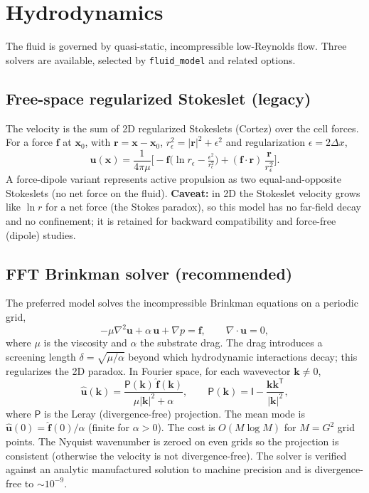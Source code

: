 \documentclass[11pt]{article}
\newcommand{\vu}{\bm{u}}
\newcommand{\vf}{\bm{f}}
\newcommand{\vx}{\bm{x}}
\newcommand{\vk}{\bm{k}}
\newcommand{\vr}{\bm{r}}
\newcommand{\grad}{\nabla}
\newcommand{\dx}{\Delta x}
\begin{document}
\section{Hydrodynamics}\label{sec:fluid}

The fluid is governed by quasi-static, incompressible low-Reynolds flow. Three
solvers are available, selected by \texttt{fluid\_model} and related options.

\subsection{Free-space regularized Stokeslet (legacy)}
The velocity is the sum of 2D regularized Stokeslets (Cortez) over the cell
forces. For a force $\vf$ at $\vx_0$, with $\vr=\vx-\vx_0$,
$r_\epsilon^2 = \lvert\vr\rvert^2+\epsilon^2$ and regularization
$\epsilon = 2\dx$,
\begin{equation}
  \vu(\vx) = \frac{1}{4\pi\mu}\Big[
  -\vf\big(\ln r_\epsilon - \tfrac{\epsilon^2}{r_\epsilon^2}\big)
  + (\vf\cdot\vr)\,\frac{\vr}{r_\epsilon^2}\Big].
\end{equation}
A force-dipole variant represents active propulsion as two equal-and-opposite
Stokeslets (no net force on the fluid). \textbf{Caveat:} in 2D the Stokeslet
velocity grows like $\ln r$ for a net force (the Stokes paradox), so this model
has no far-field decay and no confinement; it is retained for backward
compatibility and force-free (dipole) studies.

\subsection{FFT Brinkman solver (recommended)}
The preferred model solves the incompressible Brinkman equations on a periodic
grid,
\begin{equation}
  -\mu\grad^2\vu + \alpha\,\vu + \grad p = \vf, \qquad \grad\cdot\vu = 0,
  \label{eq:brinkman}
\end{equation}
where $\mu$ is the viscosity and $\alpha$ the substrate drag. The drag
introduces a screening length $\delta = \sqrt{\mu/\alpha}$ beyond which
hydrodynamic interactions decay; this regularizes the 2D paradox. In Fourier
space, for each wavevector $\vk\neq 0$,
\begin{equation}
  \hat{\vu}(\vk) = \frac{\mathsf{P}(\vk)\,\hat{\vf}(\vk)}{\mu\lvert\vk\rvert^2+\alpha},
  \qquad
  \mathsf{P}(\vk) = \mathsf{I} - \frac{\vk\vk^{\mathsf{T}}}{\lvert\vk\rvert^2},
  \label{eq:brinkman-fft}
\end{equation}
where $\mathsf{P}$ is the Leray (divergence-free) projection. The mean mode is
$\hat{\vu}(0)=\hat{\vf}(0)/\alpha$ (finite for $\alpha>0$). The cost is
$O(M\log M)$ for $M=G^2$ grid points. The Nyquist wavenumber is zeroed on even
grids so the projection is consistent (otherwise the velocity is not
divergence-free). The solver is verified against an analytic manufactured
solution to machine precision and is divergence-free to $\sim 10^{-9}$.
\end{document}
